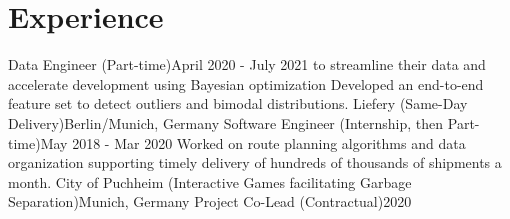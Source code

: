 \documentclass[a4paper,20pt]{article}
\begin{document}


\vspace{-5pt}
\section{Experience}
  \resumeSubHeadingListStart
    {Data Engineer (Part-time)}{April 2020 - July 2021}
    \resumeItemListStart
          {to streamline their data and accelerate development using Bayesian optimization}
          {Developed an end-to-end feature set to detect outliers and bimodal distributions.}
      \resumeItemListEnd
    \resumeSubheading
		{Liefery (Same-Day Delivery)}{Berlin/Munich, Germany}
		{Software Engineer (Internship, then Part-time)}{May 2018 - Mar 2020}
		\resumeItemListStart
          {Worked on route planning algorithms and data organization supporting timely delivery of hundreds of thousands of shipments a month.}
		\resumeItemListEnd
    \resumeSubheading
		{City of Puchheim (Interactive Games facilitating Garbage Separation)}{Munich, Germany}
		{Project Co-Lead (Contractual)}{2020}
		\resumeItemListStart
		\resumeItemListEnd

\resumeSubHeadingListEnd

\vspace{-5pt}
\end{document}
